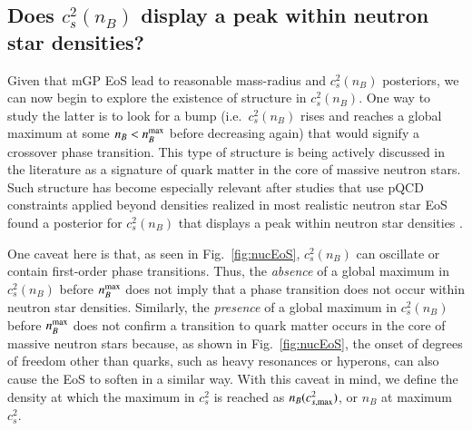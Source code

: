 \documentclass[aps,prd,nofootinbib,tightenlines,notitlepage,floatfix,superscriptaddress,showkeys,twocolumn]{revtex4-1}
\begin{document}
\subsection{Does $c_s^2(n_B)$ display a peak within neutron star densities?}

Given that mGP EoS lead to reasonable mass-radius and $c_s^2(n_B)$ posteriors, we can now begin to explore the existence of structure in $c_s^2(n_B)$. One way to study the latter is to look for a bump (i.e.~$c_s^2(n_B)$ rises and reaches a global maximum at some $n_B<n_B^{\rm max}$ before decreasing again) that would signify a crossover phase transition. This type of structure is being actively discussed in the literature \cite{Marczenko:2022jhl,Annala:2019puf,Annala:2023cwx,Pang:2023dqj,Takatsy:2023xzf,Gorda:2022jvk,Altiparmak:2022bke} as a signature of quark matter in the core of massive neutron stars. Such structure has become especially relevant after studies that use pQCD constraints applied beyond densities realized in most realistic neutron star EoS found a posterior for $c_s^2(n_B)$ that displays a peak within neutron star densities \cite{Annala:2023cwx,Gorda:2022jvk}.

One caveat here is that, as seen in Fig.~\ref{fig:nucEoS}, $c_s^2(n_B)$ can oscillate or contain first-order phase transitions. Thus, the \emph{absence} of a global maximum in $c_s^2(n_B)$ before $n_B^{\rm max}$ does not imply that  a phase transition does not occur within neutron star densities. Similarly, the \emph{presence} of a global maximum in $c_s^2(n_B)$ before $n_B^{\rm max}$ does not confirm a transition to quark matter occurs in the core of massive neutron stars because, as shown in Fig.~\ref{fig:nucEoS}, the onset of degrees of freedom other than quarks, such as heavy resonances or hyperons, can also cause the EoS to soften in a similar way. With this caveat in mind, we define the density at which the maximum in $c_s^2$ is reached as $n_B(c^2_{s,{\rm max}})$, or $n_B$ at maximum $c_s^2$. 
\end{document}
